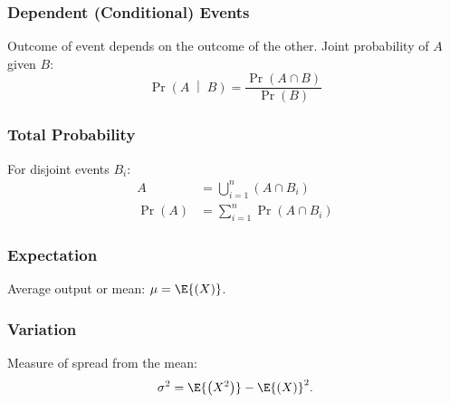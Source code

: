 \documentclass{article}
\begin{document}
\begin{multicols}{3}
    \subsubsection*{Dependent (Conditional) Events}
    Outcome of event depends on the outcome of the other. Joint probability of $A$ given $B$:
    \begin{equation*}
        \Pr{\left(A \;\middle|\; B\right)} = \frac{\Pr{\left( A \cap B \right)}}{\Pr{\left( B \right)}}
    \end{equation*}
    \subsubsection*{Total Probability}
    For disjoint events $B_i$:
    \begin{align*}
        A                     & = \bigcup\limits_{i=1}^n \left( A \cap B_i \right) \\
        \Pr{\left( A \right)} & = \sum_{i=1}^n \Pr{\left( A \cap B_i \right)}
    \end{align*}
    \subsubsection*{Expectation}
    Average output or mean: $\mu = \E{\left( X \right)}$.
    \subsubsection*{Variation}
    Measure of spread from the mean:
    \begin{equation*}
        \sigma^2 = \E{\left( X^2 \right)} - \E{\left( X \right)}^2.
    \end{equation*}
\end{multicols}
\end{document}

